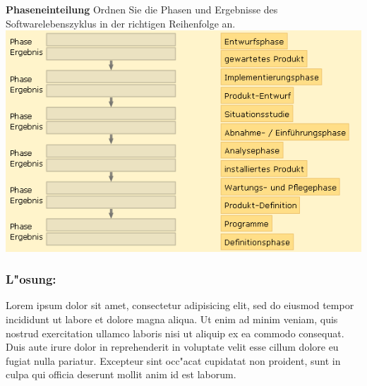 \begin{framed}
\textbf{Phaseneinteilung}
\smallbreak
Ordnen Sie die Phasen und Ergebnisse des Softwarelebenszyklus in der richtigen Reihenfolge an.
\bigbreak
\includegraphics[width=1.0\textwidth]{./images/ueb01-07.png}
\end{framed}
\bigbreak
\bigbreak
\subsubsection*{L"osung:}
Lorem ipsum dolor sit amet, consectetur adipisicing elit, sed do eiusmod tempor incididunt ut labore et dolore magna aliqua. Ut enim ad minim veniam, quis nostrud exercitation ullamco laboris nisi ut aliquip ex ea commodo consequat. Duis aute irure dolor in reprehenderit in voluptate velit esse cillum dolore eu fugiat nulla pariatur. Excepteur sint occ"acat cupidatat non proident, sunt in culpa qui officia deserunt mollit anim id est laborum.










\clearpage
\setlength\bibitemsep{10pt}
\printbibliography[heading=bibintoc]
\newpage
\printglossary[type=main]
\printglossary[type=\acronymtype]




